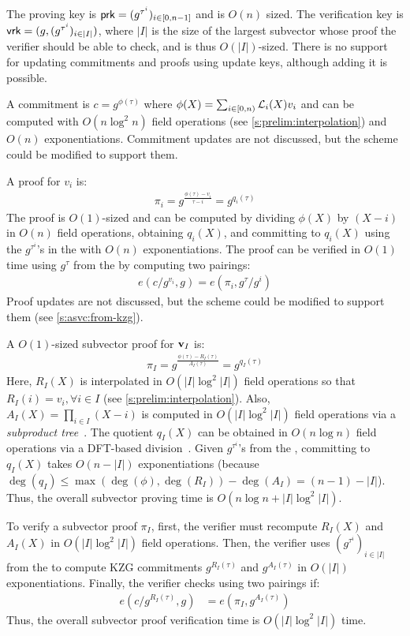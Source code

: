 The proving key is $\mathsf{prk}=(g^{\tau^i})_{i\in [0,n-1]}$ and is $O(n)$ sized.
The verification key is $\mathsf{vrk}=(g,(g^{\tau^i})_{i\in |I|})$, where $|I|$ is the size of the largest subvector whose proof the verifier should be able to check, and is thus $O(|I|)$-sized.
There is no support for updating commitments and proofs using update keys, although adding it is possible.

A commitment is $c=g^{\phi(\tau)}$ where $\phi(X)=\sum_{i\in [0,n)} \mathcal{L}_i(X) v_i$ and can be computed with $O(n\log^2{n})$ field operations (see \cref{s:prelim:interpolation}) and $O(n)$ exponentiations.
Commitment updates are not discussed, but the scheme could be modified to support them.

A proof for $v_i$ is:
\begin{align}
\pi_i = g^{\frac{\phi(\tau)-v_i}{\tau - i}} = g^{q_i(\tau)}
\end{align}
The proof is $O(1)$-sized and can be computed by dividing $\phi(X)$ by $(X-i)$ in $O(n)$ field operations, obtaining $q_i(X)$, and committing to $q_i(X)$ using the $g^{\tau^i}$'s in the \prk with $O(n)$ exponentiations.
The proof can be verified in $O(1)$ time using $g^\tau$ from the \vrk by computing two pairings:
\begin{align}
e(c/g^{v_i}, g) = e(\pi_i, g^{\tau}/g^{i})
\end{align}
Proof updates are not discussed, but the scheme could be modified to support them (see \cref{s:asvc:from-kzg}).

A $O(1)$-sized subvector proof for $\bm{\mathrm{v}}_I$ is:
\begin{align}
\pi_I=g^\frac{\phi(\tau)-R_I(\tau)}{A_I(\tau)}=g^{q_I(\tau)}
\end{align}
Here, $R_I(X)$ is interpolated in $O(|I|\log^2{|I|})$ field operations so that $R_I(i) = v_i,\forall i\in I$ (see \cref{s:prelim:interpolation}).
Also, $A_I(X)= \prod_{i\in I} (X-i)$ is computed in $O(|I|\log^2{|I|})$ field operations via a \textit{subproduct tree}~\cite{vG13ModernCh10}.
The quotient $q_I(X)$ can be obtained in $O(n\log{n})$ field operations via a DFT-based division~\cite{vG13ModernCh9}.
Given $g^{\tau^i}$'s from the \prk, committing to $q_I(X)$ takes $O(n-|I|)$ exponentiations (because $\deg(q_I)\le\max(\deg(\phi),\deg(R_I))-\deg(A_I)=(n-1)-|I|$).
Thus, the overall subvector proving time is $O(n\log{n}+|I|\log^2{|I|})$.

To verify a subvector proof $\pi_I$, first, the verifier must recompute $R_I(X)$ and $A_I(X)$ in $O(|I|\log^2{|I|})$ field operations.
Then, the verifier uses $(g^{\tau^i})_{i\in |I|}$ from the \vrk to compute KZG commitments $g^{R_I(\tau)}$ and $g^{A_I(\tau)}$ in $O(|I|)$ exponentiations.
Finally, the verifier checks using two pairings if:
\begin{align}
e(c/g^{R_I(\tau)},g) &= e(\pi_I, g^{A_I(\tau)})
\end{align}
Thus, the overall subvector proof verification time is $O(|I|\log^2{|I|})$ time.

